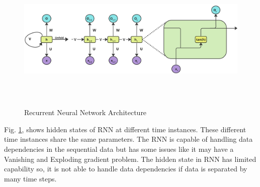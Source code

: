 \documentclass{ws-ijait}
\begin{document}
\begin{center}
	\begin{figure}[!htbp]
		\centering
		\includegraphics[width=15cm, height=7cm]{RNN.jpg}
		\caption{Recurrent Neural Network Architecture}
		\label{figrnn1}
	\end{figure}
\end{center}


Fig. \ref{figrnn1}, shows hidden states of RNN at different time instances. These different time instances share the same parameters. The RNN is capable of handling data dependencies in the sequential data but has some issues like it may have a Vanishing and Exploding gradient problem. The hidden state in RNN has limited capability so, it is not able to handle data dependencies if data is separated by many time steps.
\end{document}
